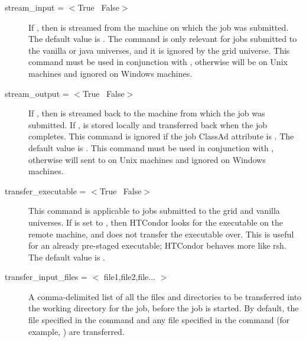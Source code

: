 \begin{description}
\label{man-condor-submit-stream-input}
\item[stream\_input = $<$True \Bar\ False$>$]
If , then  is streamed from the
machine on which the job was submitted.
The default value is .
The command is only relevant for jobs submitted to
the vanilla or java universes, and
it is ignored by the grid
universe.
This command must be used in conjunction with 
, otherwise  will
be  on Unix machines and
ignored on Windows machines.

\label{man-condor-submit-stream-output}
\item[stream\_output = $<$True \Bar\ False$>$]
If , then  is streamed back to
the machine from which the job was submitted.
If ,  is stored locally
and transferred back when the job completes.
This command is ignored if the job ClassAd attribute
 is
.
The default value is .
This command must be used in conjunction with 
, otherwise  will
sent to  on Unix machines and
ignored on Windows machines.


\label{man-condor-submit-transfer-executable}
\item[transfer\_executable = $<$True \Bar\ False$>$]
This command is applicable to jobs submitted to the grid
and vanilla universes.
If  is set to
, then HTCondor looks for the executable on the remote machine, and
does not transfer the executable over.
This is useful for an already pre-staged 
executable; HTCondor behaves more like rsh.
The default value is .


\item[transfer\_input\_files = $<$ file1,file2,file... $>$]
\label{man-condor-submit-transfer-input-files}
A comma-delimited list of all the files and directories to be transferred
into the working directory for the job, before the job is started.
By default, the file specified in the
 command and any file specified in the 
command (for example, ) are transferred.


\end{description}

